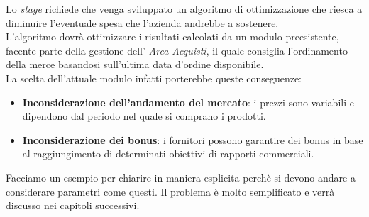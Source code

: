 \noindent Lo \textit{stage} richiede che venga sviluppato un algoritmo di ottimizzazione che riesca a diminuire l'eventuale spesa che l'azienda andrebbe
a sostenere.\\
L'algoritmo dovrà ottimizzare i risultati calcolati da un modulo preesistente, facente parte della gestione dell' \textit{Area Acquisti}, il quale
consiglia l'ordinamento della merce basandosi sull'ultima data d'ordine disponibile.\\
\newpage
\noindent La scelta dell'attuale modulo infatti porterebbe queste conseguenze:
\begin{itemize}
    \item \textbf{Inconsiderazione dell'andamento del mercato}: i prezzi sono variabili e dipendono dal periodo nel quale si comprano i prodotti.
    \item \textbf{Inconsiderazione dei bonus}: i fornitori possono garantire dei bonus in base al raggiungimento di determinati obiettivi di rapporti commerciali.
\end{itemize}

\noindent Facciamo un esempio per chiarire in maniera esplicita perchè si devono andare a considerare parametri come questi. Il problema
è molto semplificato e verrà discusso nei capitoli successivi.\\

\renewcommand{\arraystretch}{1.2}

